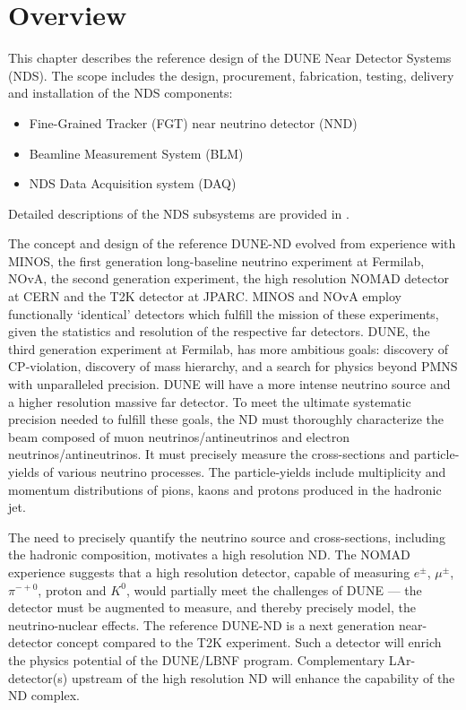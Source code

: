 \section{Overview} %
\label{sec:detectors-nd-ref-ov}

This chapter describes the reference design of the DUNE Near Detector
Systems (NDS). The scope includes the design, procurement,
fabrication, testing, delivery and installation of the NDS components:
\begin{itemize}
\item Fine-Grained Tracker (FGT) near neutrino detector (NND)
\item Beamline Measurement System (BLM)
\item NDS Data Acquisition system (DAQ)  
\end{itemize}
Detailed descriptions of the NDS subsystems are provided in \anxndref. 


The concept and design of the reference DUNE-ND evolved from
experience with MINOS, the first generation long-baseline
neutrino experiment at Fermilab, NOvA, the second generation
experiment, the high resolution NOMAD detector at CERN and the T2K
detector at JPARC. MINOS and NOvA employ functionally `identical'
detectors which fulfill the mission of these experiments, given the
statistics and resolution of the respective far detectors.  DUNE, the
third generation experiment at Fermilab, has more ambitious goals:
discovery of CP-violation, discovery of mass hierarchy, and a search
for physics beyond PMNS with unparalleled precision. DUNE will have a
more intense neutrino source and a higher resolution massive far detector.  To
meet the ultimate systematic precision needed to fulfill these goals,
the ND must thoroughly characterize the beam composed of muon
neutrinos/antineutrinos and electron neutrinos/antineutrinos. It must
precisely measure the cross-sections and particle-yields of various
neutrino processes.  The particle-yields include multiplicity and
momentum distributions of pions, kaons and protons produced in the
hadronic jet.

The need to precisely quantify the neutrino source and
cross-sections, including the hadronic composition, motivates
a high resolution ND. The NOMAD experience suggests that a high
resolution detector, capable of measuring $e^{\pm}$, $\mu^{\pm}$,
$\pi^{-+0}$, proton and $K^{0}$, would partially meet the
challenges of DUNE --- the detector must be augmented to measure, and
thereby precisely model, the neutrino-nuclear effects. The reference
DUNE-ND is a next generation near-detector concept
compared to the T2K experiment. Such a detector will
enrich the physics potential of the DUNE/LBNF program.  Complementary
LAr-detector(s) upstream of the high resolution ND will enhance the
capability of the ND complex.


